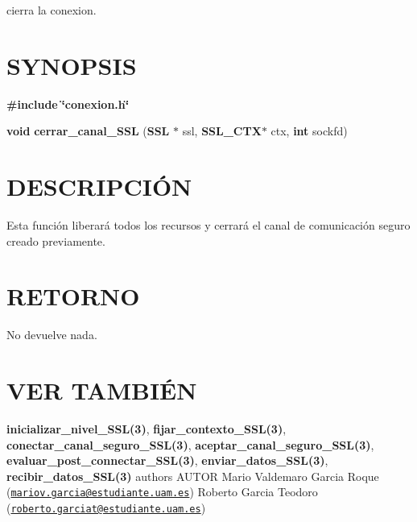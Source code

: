 cierra la conexion.\hypertarget{cerrar_canal__s_s_l_SYNOPSIS}{}\section{S\-Y\-N\-O\-P\-S\-I\-S}\label{cerrar_canal__s_s_l_SYNOPSIS}
{\bfseries \#include} {\bfseries \char`\"{}conexion.\-h\char`\"{}} 

{\bfseries void} {\bfseries cerrar\-\_\-canal\-\_\-\-S\-S\-L} {\bfseries }({\bfseries S\-S\-L} $\ast$ ssl, {\bfseries S\-S\-L\-\_\-\-C\-T\-X$\ast$} ctx, {\bfseries int} sockfd{\bfseries })\hypertarget{cerrar_canal__s_s_l_descripcion}{}\section{D\-E\-S\-C\-R\-I\-P\-C\-IÓ\-N}\label{cerrar_canal__s_s_l_descripcion}
Esta función liberará todos los recursos y cerrará el canal de comunicación seguro creado previamente.\hypertarget{cerrar_canal__s_s_l_retorno}{}\section{R\-E\-T\-O\-R\-N\-O}\label{cerrar_canal__s_s_l_retorno}
No devuelve nada.\hypertarget{cerrar_canal__s_s_l_seealso}{}\section{V\-E\-R T\-A\-M\-B\-IÉ\-N}\label{cerrar_canal__s_s_l_seealso}
{\bfseries inicializar\-\_\-nivel\-\_\-\-S\-S\-L(3)}, {\bfseries fijar\-\_\-contexto\-\_\-\-S\-S\-L(3)}, {\bfseries conectar\-\_\-canal\-\_\-seguro\-\_\-\-S\-S\-L(3)}, {\bfseries aceptar\-\_\-canal\-\_\-seguro\-\_\-\-S\-S\-L(3)}, {\bfseries evaluar\-\_\-post\-\_\-connectar\-\_\-\-S\-S\-L(3)}, {\bfseries enviar\-\_\-datos\-\_\-\-S\-S\-L(3)}, {\bfseries recibir\-\_\-datos\-\_\-\-S\-S\-L(3)} {\bfseries }  authors A\-U\-T\-O\-R Mario Valdemaro Garcia Roque (\href{mailto:mariov.garcia@estudiante.uam.es}{\tt mariov.\-garcia@estudiante.\-uam.\-es}) Roberto Garcia Teodoro (\href{mailto:roberto.garciat@estudiante.uam.es}{\tt roberto.\-garciat@estudiante.\-uam.\-es}) 